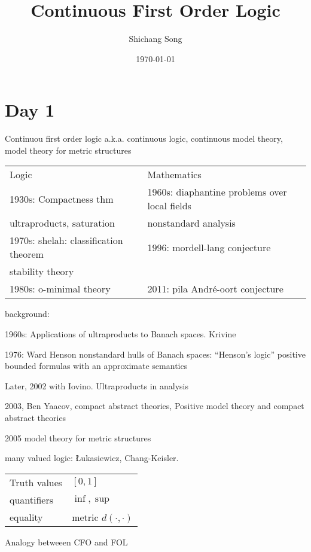 \documentclass[11pt]{article}
\author{Shichang Song}
\date{\today}
\title{Continuous First Order Logic}
\begin{document}
\maketitle
\tableofcontents

\section{Day 1}
\label{sec:org6ddcaf9}
Continuou first order logic a.k.a. continuous logic, continuous model theory, model theory for
metric structures

\begin{center}
\begin{tabular}{ll}
Logic & Mathematics\\
1930s: Compactness thm & 1960s: diaphantine problems over local fields\\
ultraproducts, saturation & nonstandard analysis\\
1970s: shelah: classification theorem & 1996: mordell-lang conjecture\\
stability theory & \\
1980s: o-minimal theory & 2011: pila André-oort conjecture\\
\end{tabular}
\end{center}

background:

1960s: Applications of ultraproducts to Banach spaces. Krivine

1976: Ward Henson nonstandard hulls of Banach spaces: ``Henson's logic'' positive bounded formulas
with an approximate semantics

Later, 2002 with Iovino. Ultraproducts in analysis

2003, Ben Yaacov, compact abstract theories, Positive model theory and compact abstract theories

2005 model theory for metric structures

many valued logic: Łukasiewicz, Chang-Keisler.

\begin{center}
\begin{tabular}{ll}
Truth values & \([0,1]\)\\
quantifiers & \(\inf,\sup\)\\
equality & metric \(d(\cdot,\cdot)\)\\
\end{tabular}
\end{center}

Analogy betweeen CFO and FOL
\end{document}
